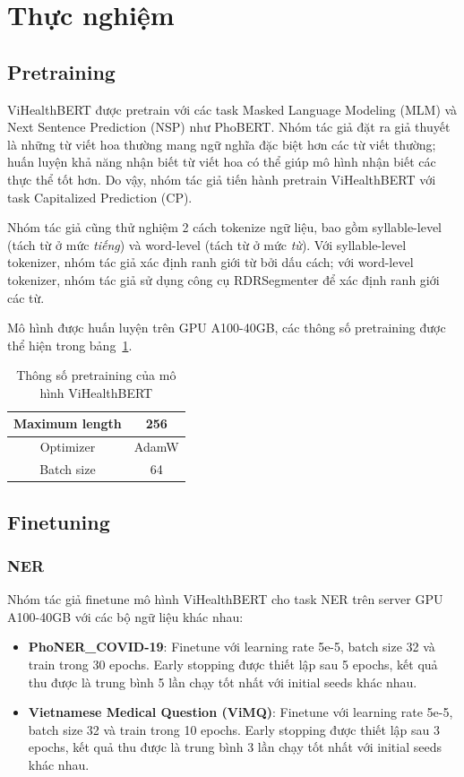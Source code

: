 \section{Thực nghiệm}
\subsection{Pretraining}
ViHealthBERT được pretrain với các task Masked Language Modeling (MLM) và Next Sentence Prediction (NSP) như PhoBERT. Nhóm tác giả đặt ra giả thuyết là những từ viết hoa thường mang ngữ nghĩa đặc biệt hơn các từ viết thường;  huấn luyện khả năng nhận biết từ viết hoa có thể giúp mô hình nhận biết các thực thể tốt hơn. Do vậy, nhóm tác giả tiến hành pretrain ViHealthBERT với task Capitalized Prediction (CP). 

Nhóm tác giả cũng thử nghiệm 2 cách tokenize ngữ liệu, bao gồm syllable-level (tách từ ở mức \textit{tiếng}) và word-level (tách từ ở mức \textit{từ}). Với syllable-level tokenizer, nhóm tác giả xác định ranh giới từ bởi dấu cách; với word-level tokenizer, nhóm tác giả sử dụng công cụ RDRSegmenter\cite{NguyenNVDJ2018} để xác định ranh giới các từ.

Mô hình được huấn luyện trên GPU A100-40GB, các thông số pretraining được thể hiện trong bảng~\ref{tab:pretraining-hyperparams}.

\begin{table}
\centering
\begin{tabular}{|c|c|}
\hline
Maximum length & 256 \\ \hline
Optimizer & AdamW \\ \hline
Batch size & 64 \\ \hline
\end{tabular}
\caption{Thông số pretraining của mô hình ViHealthBERT\cite{minh-EtAl:2022:LREC}}
\label{tab:pretraining-hyperparams}
\end{table}

\subsection{Finetuning}
\subsubsection{NER}
Nhóm tác giả finetune mô hình ViHealthBERT cho task NER trên server GPU A100-40GB với các bộ ngữ liệu khác nhau:
\begin{itemize}
\item \textbf{PhoNER\_COVID-19}: Finetune với learning rate 5e-5, batch size 32 và train trong 30 epochs. Early stopping được thiết lập sau 5 epochs, kết quả thu được là trung bình 5 lần chạy tốt nhất với initial seeds khác nhau.
\item \textbf{Vietnamese Medical Question (ViMQ)}: Finetune với learning rate 5e-5, batch size 32 và train trong 10 epochs. Early stopping được thiết lập sau 3 epochs, kết quả thu được là trung bình 3 lần chạy tốt nhất với initial seeds khác nhau.
\end{itemize}

